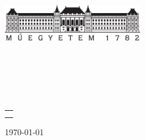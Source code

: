 \hypersetup{pageanchor=false}
\begin{titlepage}
\begin{center}
\includegraphics[width=60mm,keepaspectratio]{figures/bme_logo.pdf}\\
\vspace{0.3cm}
\textbf{\bme}\\
\textmd{\vik}\\
\textmd{\viktanszek}\\[5cm]

\vspace{0.4cm}
{\huge \bfseries \vikcim}\\[0.8cm]
\vspace{0.5cm}
\textsc{\Large \vikdoktipus}\\[4cm]

{
	\renewcommand{\arraystretch}{0.85}
	\begin{tabular}{c}
		\makebox[7cm]{\emph{\keszitette}} \\ \noalign{\smallskip}
		\makebox[7cm]{\szerzo} \\
	\end{tabular}
}


\vfill
{\large \today}
\end{center}
\end{titlepage}
\hypersetup{pageanchor=false}

